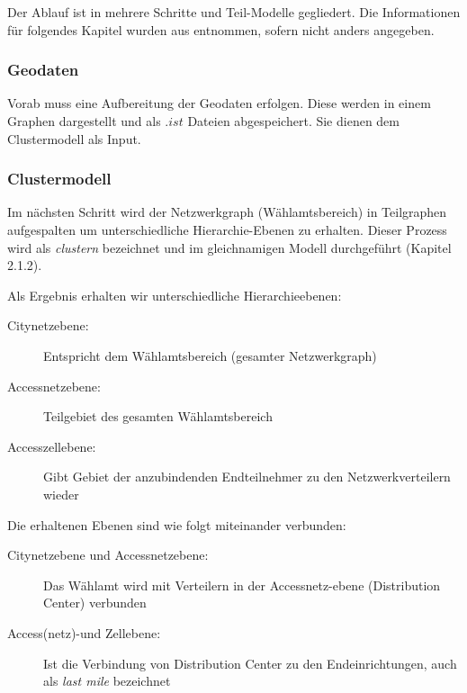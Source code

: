 \vspace{0.5cm}


Der Ablauf ist in mehrere Schritte und Teil-Modelle gegliedert. Die Informationen für folgendes Kapitel wurden aus \cite{pinkafeld1 } entnommen,
sofern nicht anders angegeben. 

\subsubsection{Geodaten}
Vorab muss eine Aufbereitung der Geodaten\cite{prossegger1} erfolgen. Diese werden in einem Graphen dargestellt und als $.ist$ Dateien abgespeichert. 
Sie dienen dem Clustermodell als Input.
\subsubsection{Clustermodell}

Im nächsten Schritt wird der Netzwerkgraph (Wählamtsbereich) in Teilgraphen aufgespalten um unterschiedliche Hierarchie-Ebenen zu erhalten. 
Dieser Prozess wird als \textit{clustern} bezeichnet und im gleichnamigen Modell durchgeführt (Kapitel 2.1.2).  
\vspace{0.3cm}

Als Ergebnis erhalten wir unterschiedliche Hierarchieebenen:

\begin{description}
\item[Citynetzebene:] Entspricht dem Wählamtsbereich (gesamter Netzwerkgraph)
\item[Accessnetzebene:] Teilgebiet des gesamten Wählamtsbereich 
\item[Accesszellebene:] Gibt Gebiet der anzubindenden Endteilnehmer zu den Netzwerkverteilern wieder
\end{description}

\vspace{0.5cm}

Die erhaltenen Ebenen sind wie folgt miteinander verbunden:


\begin{description}
\item[Citynetzebene und Accessnetzebene:] Das Wählamt wird mit Verteilern in der Accessnetz-ebene (Distribution Center) verbunden
\item[Access(netz)-und Zellebene:] Ist die Verbindung von Distribution Center zu den Endeinrichtungen, auch als \textit{last mile} bezeichnet
\end{description}


